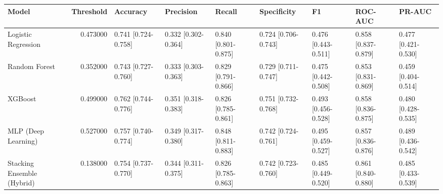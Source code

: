 \begin{tabular}{lrlllllll}
\toprule
Model & Threshold & Accuracy & Precision & Recall & Specificity & F1 & ROC-AUC & PR-AUC \\
\midrule
Logistic Regression & 0.473000 & 0.741 [0.724-0.758] & 0.332 [0.302-0.364] & 0.840 [0.801-0.875] & 0.724 [0.706-0.743] & 0.476 [0.443-0.511] & 0.858 [0.837-0.879] & 0.477 [0.421-0.530] \\
Random Forest & 0.352000 & 0.743 [0.727-0.760] & 0.333 [0.303-0.363] & 0.829 [0.791-0.866] & 0.729 [0.711-0.747] & 0.475 [0.442-0.508] & 0.853 [0.831-0.869] & 0.459 [0.404-0.514] \\
XGBoost & 0.499000 & 0.762 [0.744-0.776] & 0.351 [0.318-0.383] & 0.826 [0.785-0.861] & 0.751 [0.732-0.768] & 0.493 [0.456-0.528] & 0.858 [0.836-0.875] & 0.480 [0.428-0.535] \\
MLP (Deep Learning) & 0.527000 & 0.757 [0.740-0.774] & 0.349 [0.317-0.380] & 0.848 [0.811-0.883] & 0.742 [0.724-0.761] & 0.495 [0.459-0.527] & 0.857 [0.836-0.876] & 0.489 [0.436-0.542] \\
Stacking Ensemble (Hybrid) & 0.138000 & 0.754 [0.737-0.770] & 0.344 [0.311-0.375] & 0.826 [0.785-0.863] & 0.742 [0.723-0.760] & 0.485 [0.449-0.520] & 0.861 [0.840-0.880] & 0.485 [0.433-0.539] \\
\bottomrule
\end{tabular}
